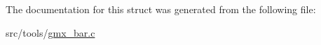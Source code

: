 \-The documentation for this struct was generated from the following file\-:\begin{DoxyCompactItemize}
\item 
src/tools/\hyperlink{gmx__bar_8c}{gmx\-\_\-bar.\-c}\end{DoxyCompactItemize}
